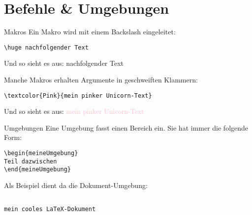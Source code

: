 \section{Befehle \& Umgebungen}

\begin{frame}[fragile]{Makros}
Ein Makro wird mit einem Backslash eingeleitet:

\begin{lstlisting}[style=tex]
\huge nachfolgender Text
\end{lstlisting}

Und so sieht es aus: {\huge nachfolgender Text}

\vspace{2ex}
\pause Manche Makros erhalten Argumente in geschweiften Klammern:
\begin{lstlisting}[style=tex]
\textcolor{Pink}{mein pinker Unicorn-Text}
\end{lstlisting}

Und so sieht es aus: \textcolor{Pink}{mein pinker Unicorn-Text}
\end{frame}

\begin{frame}[fragile]{Umgebungen}
Eine Umgebung fasst einen Bereich ein. Sie hat immer die folgende Form:

\begin{lstlisting}[style=tex]
\begin{meineUmgebung}
Teil dazwischen
\end{meineUmgebung}\end{lstlisting}

\pause Als Beispiel dient da die Dokument-Umgebung:

\begin{lstlisting}[style=tex]

mein cooles LaTeX-Dokument
\end{lstlisting}
\end{frame}